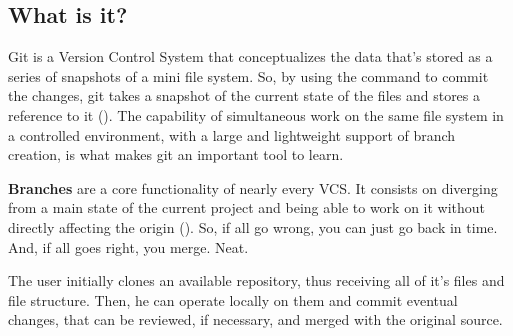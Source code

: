 \documentclass[a4paper,11pt]{article}
\begin{document}
\subsection{What is it?}
Git is a Version Control System that conceptualizes the data that's stored as
a series of snapshots of a mini file system. So, by using the command to commit
the changes, git takes a snapshot of the current state of the files and stores
a reference to it (\cite{straubProGit2025}). The capability of simultaneous work
on the same file system in a controlled environment, with a large and
lightweight support of branch creation, is what makes git an important tool to
learn.\par
\begin{definitionbox}
    \textbf{Branches} are a core functionality of nearly every VCS. It consists
    on diverging from a main state of the current project and being able to work
    on it without directly affecting the origin (\cite{straubProGit2025}).
    So, if all go wrong,
    you can just go back in time. And, if all goes right, you merge. Neat.
\end{definitionbox}
The user initially clones an available repository, thus receiving all of it's
files and file structure. Then, he can operate locally on them and commit
eventual changes, that can be reviewed, if necessary, and merged with the 
original source.
\end{document}
